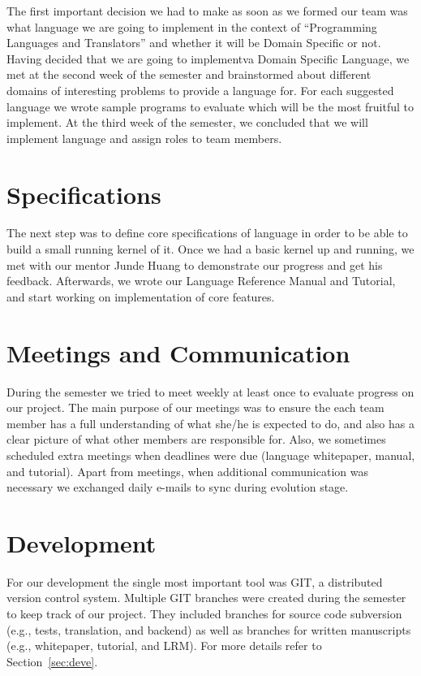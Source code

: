 The first important decision we had to make as soon as we formed
our team was what language we are going to implement in the context of
``Programming Languages and Translators'' and whether it will be Domain
Specific or not. Having decided that we are going to implementva Domain
Specific Language, we met at the second week of the semester and brainstormed
about different domains of interesting problems to provide a language for.
For each suggested language we wrote sample programs to evaluate which will be
the most fruitful to implement. At the third week of the semester, we concluded
that we will implement \lang{} language and assign roles to team members.

\section{Specifications}
The next step was to define core specifications of \lang{} language in order to
be able to build a small running kernel of it. Once we had a basic kernel up
and running, we met with our mentor Junde Huang to demonstrate our progress
and get his feedback. Afterwards, we wrote our Language Reference Manual and
Tutorial, and start working on implementation of core features.

\section{Meetings and Communication}
During the semester we tried to meet weekly at least once to evaluate progress
on our project. The main purpose of our meetings was to ensure the each team
member has a full understanding of what she/he is expected to do, and also has a
clear picture of what other members are responsible for. Also, we
sometimes scheduled extra meetings when deadlines were due (language whitepaper,
manual, and tutorial). Apart from meetings, when additional communication was
necessary we exchanged daily e-mails to sync during evolution stage.

\section{Development}
For our development the single most important tool was GIT, a distributed
version control system. Multiple GIT branches were created during the semester
to keep track of our project. They included branches for source code
subversion (e.g., tests, translation, and \lang{} backend) as well as
branches for written manuscripts (e.g., whitepaper, tutorial,  and LRM).
For more details refer to Section~\ref{sec:deve}.

